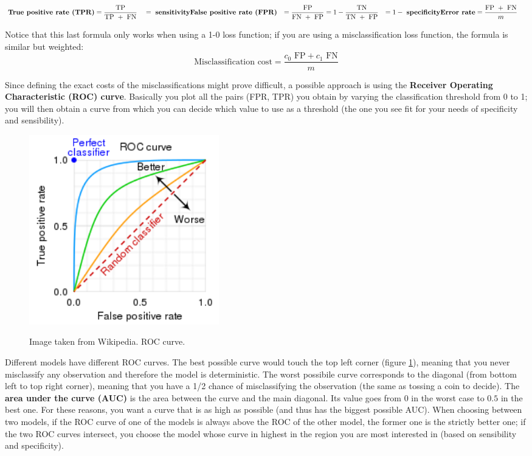     \begin{align*}
      \text{\textbf{True positive rate (TPR)}} &= \frac{\text{TP}}{\text{TP } + \text{ FN}} &
        &= \text{ \textbf{sensitivity}} 
      \text{\textbf{False positive rate (FPR)}} &= \frac{\text{FP}}{\text{FN } + \text{ FP}} 
        &= 1 - \frac{\text{TN}}{\text{TN } + \text{ FP}} &= 1 - \text{ \textbf{specificity}} 
      \text{\textbf{Error rate}} &= \frac{\text{FP } + \text{ FN}}{m}
    \end{align*}

    Notice that this last formula only works when using a 1-0 loss function; if you are using a misclassification loss function, the formula is similar but weighted:
    $$\text{Misclassification cost}= \frac{c_0 \text{ FP} + c_1 \text{ FN}}{m}$$

    Since defining the exact costs of the misclassifications might prove difficult, a possible approach is using the \textbf{Receiver Operating Characteristic (ROC) curve}. Basically you plot all the pairs (FPR, TPR) you obtain by varying the classification threshold from 0 to 1;
    you will then obtain a curve from which you can decide which value to use as a threshold (the one you see fit for your needs of specificity and sensibility). 
   
\begin{figure}[h]
\caption{Image taken from Wikipedia. ROC curve. }
\centering
\includegraphics[width=0.4\textwidth]{RocCurve}
\label{ROCcurve}
\end{figure}

    Different models have different ROC curves.
    The best possible curve would touch the top left corner (figure \ref{ROCcurve}), meaning that you never misclassify any observation and therefore the model is deterministic.
    The worst possibile curve corresponds to the diagonal (from bottom left to top right corner), meaning that you have a 1/2 chance of misclassifying the observation (the same as tossing a coin to decide).
    The \textbf{area under the curve (AUC)} is the area between the curve and the main diagonal. Its value goes from $0$ in the worst case to $0.5$ in the best one. 
    For these reasons, you want a curve that is as high as possible (and thus has the biggest possible AUC). 
    When choosing between two models, if the ROC curve of one of the models is always above the ROC of the other model, the former one is the strictly better one; if the two ROC curves intersect, you choose the model whose curve in highest in the region you are most interested in (based on sensibility and specificity).    
  